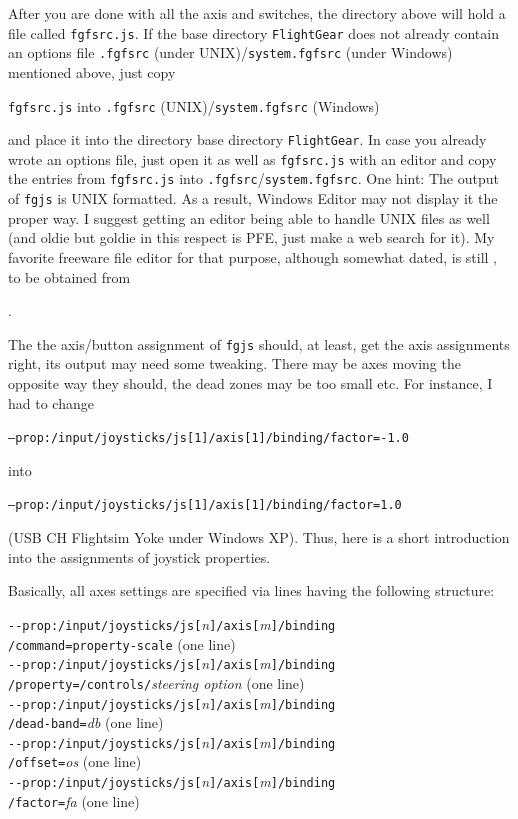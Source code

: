 After you are done with all the axis and switches, the directory above will hold a file called \texttt{fgfsrc.js}. If the \FlightGear{} base directory \texttt{FlightGear} does not already contain an options file \texttt{.fgfsrc} (under UNIX)/\texttt{system.fgfsrc} (under Windows) mentioned above, just copy
\medskip

\noindent
 \texttt{fgfsrc.js} into \texttt{.fgfsrc} (UNIX)/\texttt{system.fgfsrc} (Windows) 
 \medskip

\noindent 
and place it into the directory \FlightGear{} base directory \texttt{FlightGear}. In case you already wrote an options file, just open it as well as \texttt{fgfsrc.js} with an editor and copy the entries from \texttt{fgfsrc.js} into \texttt{.fgfsrc}/\texttt{system.fgfsrc}. One hint: The output of \texttt{fgjs} is UNIX formatted. As a result, Windows Editor may not display it the proper way. I suggest getting an editor being able to handle UNIX files as well (and oldie but goldie in this respect is PFE, just make a web search for it). My favorite freeware file editor for that purpose, although somewhat dated, is still , to be obtained from

.

The the axis/button assignment of \texttt{fgjs} should, at least, get the axis assignments right, its output may need some tweaking. There may be axes moving the opposite way they should, the dead zones may be too small etc. For instance, I had to change 

\texttt{--prop:/input/joysticks/js[1]/axis[1]/binding/factor=-1.0}

into

\texttt{--prop:/input/joysticks/js[1]/axis[1]/binding/factor=1.0}

(USB CH Flightsim Yoke under Windows XP). Thus, here is a short introduction into the assignments of joystick properties.

Basically, all axes settings are specified via lines having the following structure:
 \medskip

\noindent
\texttt{-$ $-prop:/input/joysticks/js[}\textit{n}\texttt{]/axis[}\textit{m}\texttt{]/binding}\\
\texttt{/command=property-scale} (one line)\\
\texttt{-$ $-prop:/input/joysticks/js[}\textit{n}\texttt{]/axis[}\textit{m}\texttt{]/binding}\\
\texttt{/property=/controls/}\textit{steering option} (one line)\\
\texttt{-$ $-prop:/input/joysticks/js[}\textit{n}\texttt{]/axis[}\textit{m}\texttt{]/binding}\\
\texttt{/dead-band=}\textit{db} (one line)\\
\texttt{-$ $-prop:/input/joysticks/js[}\textit{n}\texttt{]/axis[}\textit{m}\texttt{]/binding}\\
\texttt{/offset=}\textit{os} (one line)\\
\texttt{-$ $-prop:/input/joysticks/js[}\textit{n}\texttt{]/axis[}\textit{m}\texttt{]/binding}\\
\texttt{/factor=}\textit{fa} (one line)\\
\medskip

